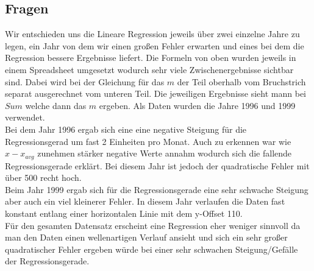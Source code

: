 \documentclass[a4paper]{article}
\begin{document}
\subsection{Fragen}Wir entschieden uns die Lineare Regression jeweils über zwei einzelne Jahre zu legen, ein Jahr von dem wir einen großen Fehler erwarten und eines bei dem die Regression bessere Ergebnisse liefert. Die Formeln von oben wurden jeweils in einem Spreadsheet umgesetzt wodurch sehr viele Zwischenergebnisse sichtbar sind. Dabei wird bei der Gleichung für das $m$ der Teil oberhalb vom Bruchstrich separat ausgerechnet vom unteren Teil. Die jeweiligen Ergebnisse sieht mann bei $Sum$ welche dann das $m$ ergeben. Als Daten wurden die Jahre 1996 und 1999 verwendet. \\
Bei dem Jahr 1996 ergab sich eine eine negative Steigung für die Regressionsgerad um fast 2 Einheiten pro Monat. Auch zu erkennen war wie $ x - x_{avg}$ zunehmen stärker negative Werte annahm wodurch sich die fallende Regressionsgerade erklärt. Bei diesem Jahr ist jedoch der quadratische Fehler mit über 500 recht hoch.\\
Beim Jahr 1999 ergab sich für die Regressionsgerade eine sehr schwache Steigung aber auch ein viel kleinerer Fehler. In diesem Jahr verlaufen die Daten fast konstant entlang einer horizontalen Linie mit dem y-Offset 110.\\
Für den gesamten Datensatz erscheint eine Regression eher weniger sinnvoll da man den Daten einen wellenartigen Verlauf ansieht und sich ein sehr großer quadratischer Fehler ergeben würde bei einer sehr schwachen Steigung/Gefälle der Regressionsgerade.
\end{document}
